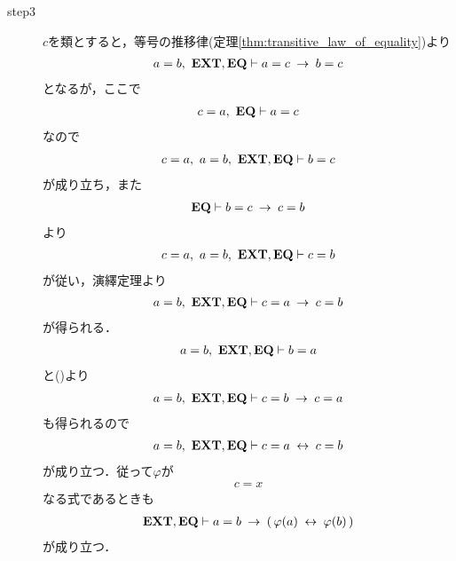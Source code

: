 \begin{sketch}
\begin{description}
			\item[step3]
				$c$を類とすると，等号の推移律(定理\ref{thm:transitive_law_of_equality})より
				\begin{align}
					a = b,\ \mbox{{\bf EXT}},\mbox{{\bf EQ}} \vdash a = c \hspace{0.25em}\rightarrow\hspace{0.25em} b = c
				\end{align}
				となるが，ここで
				\begin{align}
					c = a,\ \mbox{{\bf EQ}} \vdash a = c
				\end{align}
				なので
				\begin{align}
					c = a,\ a = b,\ \mbox{{\bf EXT}},\mbox{{\bf EQ}} \vdash b = c
				\end{align}
				が成り立ち，また
				\begin{align}
					\mbox{{\bf EQ}} \vdash b = c \hspace{0.25em}\rightarrow\hspace{0.25em} c = b
				\end{align}
				より
				\begin{align}
					c = a,\ a = b,\ \mbox{{\bf EXT}},\mbox{{\bf EQ}} \vdash c = b
				\end{align}
				が従い，演繹定理より
				\begin{align}
					a = b,\ \mbox{{\bf EXT}},\mbox{{\bf EQ}} \vdash c = a \hspace{0.25em}\rightarrow\hspace{0.25em} c = b
					\label{fom:the_principle_of_substitution_1}
				\end{align}
				が得られる．
				\begin{align}
					a = b,\ \mbox{{\bf EXT}},\mbox{{\bf EQ}} \vdash b = a
				\end{align}
				と()より
				\begin{align}
					a = b,\ \mbox{{\bf EXT}},\mbox{{\bf EQ}} \vdash c = b \hspace{0.25em}\rightarrow\hspace{0.25em} c = a
				\end{align}
				も得られるので
				\begin{align}
					a = b,\ \mbox{{\bf EXT}},\mbox{{\bf EQ}} \vdash c = a \hspace{0.25em}\leftrightarrow\hspace{0.25em} c = b
				\end{align}
				が成り立つ．従って$\varphi$が
				\begin{align}
					c = x
				\end{align}
				なる式であるときも
				\begin{align}
					\mbox{{\bf EXT}},\mbox{{\bf EQ}} \vdash a = b \hspace{0.25em}\rightarrow\hspace{0.25em} (\, \varphi(a) \hspace{0.25em}\leftrightarrow\hspace{0.25em} \varphi(b)\, )
				\end{align}
				が成り立つ．
			

\end{description}
\end{sketch}
